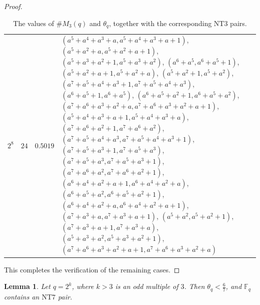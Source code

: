 \documentclass[12pt]{amsart}
\newtheorem{lemma}[theorem]{Lemma}
\theoremstyle{definition}
\theoremstyle{remark}
\numberwithin{equation}{section}
\begin{document}
\begin{proof}
\begin{table}[h]
\begin{tabular}{c|c|c|p{9cm}}
$2^8$ & $24$ & $0.5019$ &
$\left(a^5+a^4+a^3+a,a^5+a^4+a^3+a+1\right)$,
$\left(a^5+a^2+a,a^5+a^2+a+1\right)$,
$\left(a^5+a^3+a^2+1,a^5+a^3+a^2\right)$,
$\left(a^6+a^5,a^6+a^5+1\right)$,
$\left(a^5+a^2+a+1,a^5+a^2+a\right)$,
$\left(a^5+a^2+1,a^5+a^2\right)$,
$\left(a^7+a^5+a^4+a^3+1,a^7+a^5+a^4+a^3\right)$,
$\left(a^6+a^5+1,a^6+a^5\right)$,
$\left(a^6+a^5+a^2+1,a^6+a^5+a^2\right)$,
$\left(a^7+a^6+a^3+a^2+a,a^7+a^6+a^3+a^2+a+1\right)$,
$\left(a^5+a^4+a^3+a+1,a^5+a^4+a^3+a\right)$,
$\left(a^7+a^6+a^2+1,a^7+a^6+a^2\right)$,
$\left(a^7+a^5+a^4+a^3,a^7+a^5+a^4+a^3+1\right)$,
$\left(a^7+a^5+a^3+1,a^7+a^5+a^3\right)$,
$\left(a^7+a^5+a^3,a^7+a^5+a^3+1\right)$,
$\left(a^7+a^6+a^2,a^7+a^6+a^2+1\right)$,
$\left(a^6+a^4+a^2+a+1,a^6+a^4+a^2+a\right)$,
$\left(a^6+a^5+a^2,a^6+a^5+a^2+1\right)$,
$\left(a^6+a^4+a^2+a,a^6+a^4+a^2+a+1\right)$,
$\left(a^7+a^3+a,a^7+a^3+a+1\right)$,
$\left(a^5+a^2,a^5+a^2+1\right)$,
$\left(a^7+a^3+a+1,a^7+a^3+a\right)$,
$\left(a^5+a^3+a^2,a^5+a^3+a^2+1\right)$,
$\left(a^7+a^6+a^3+a^2+a+1,a^7+a^6+a^3+a^2+a\right)$
\end{tabular}
\caption{The values of $\#M_3(q)$ and $\theta_q$, together with the corresponding $\mathrm{NT}3$ pairs.}
\label{tab:nt3}
\end{table}
This completes the verification of the remaining cases.
\end{proof}
\begin{lemma}\label{L2.3}
Let $q=2^k$, where $k>3$ is an odd multiple of $3$. Then $\theta_q<\frac{6}{7}$, and $\mathbb{F}_q$ contains an $\mathrm{NT}7$ pair.
\end{lemma}
\end{document}
